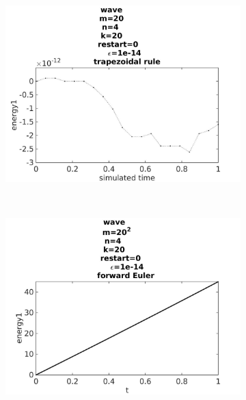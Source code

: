 \begin{figure}[H]
        \centering
        \begin{subfigure}[b]{0.30\textwidth}
                \includegraphics[width=\textwidth]{../MATLAB/fig/energyovertimetrapezoidal.jpg}
                \caption{  }
                \label{fig:errortrap}
        \end{subfigure}%
        ~
        \begin{subfigure}[b]{0.30\textwidth}
                \includegraphics[width=\textwidth]{../MATLAB/fig/energyovertimeeuler.jpg}
                \caption{  }
                \label{fig:erroreul}
        \end{subfigure}

\end{figure}
